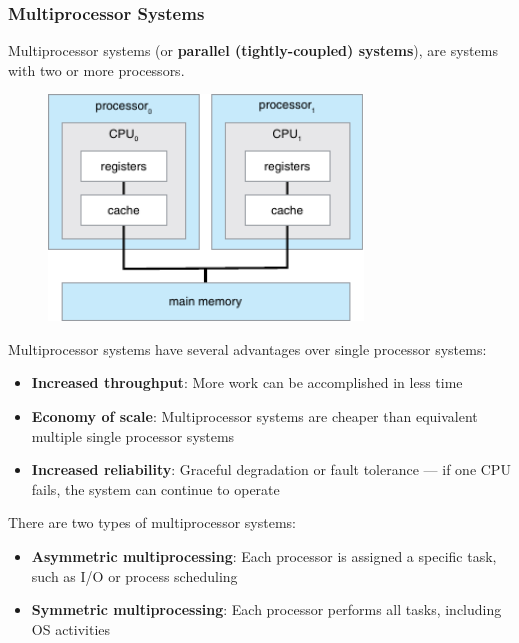 \documentclass{article}
\begin{document}
\subsubsection{Multiprocessor Systems}
Multiprocessor systems (or \textbf{parallel (tightly-coupled)
systems}), are systems with two or more processors.
\begin{figure}[H]
    \centering
    \includegraphics[height = 6cm]{figures/multiprocessing.pdf}
\end{figure}
Multiprocessor systems have several advantages over single processor
systems:
\begin{itemize}
    \item \textbf{Increased throughput}: More work can be accomplished
          in less time
    \item \textbf{Economy of scale}: Multiprocessor systems are cheaper
          than equivalent multiple single processor systems
    \item \textbf{Increased reliability}: Graceful degradation or fault
          tolerance --- if one CPU fails, the system can continue to
          operate
\end{itemize}
There are two types of multiprocessor systems:
\begin{itemize}
    \item \textbf{Asymmetric multiprocessing}: Each processor is
          assigned a specific task, such as I/O or process scheduling
    \item \textbf{Symmetric multiprocessing}: Each processor performs
          all tasks, including OS activities
\end{itemize}
\end{document}
